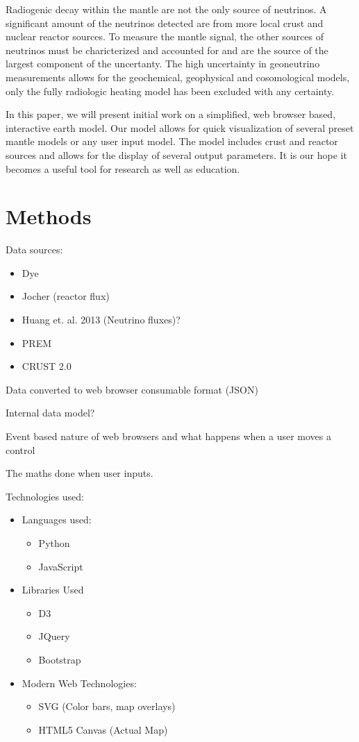 \documentclass[12pt,a4paper]{article}
\begin{document}
Radiogenic decay within the mantle are not the only source of neutrinos.
A significant amount of the neutrinos detected are from more local crust and nuclear reactor sources.
To measure the mantle signal, the other sources of neutrinos must be charicterized and accounted for and are the source of the largest component of the uncertanty\cite{Dye2010}.
The high uncertainty in geoneutrino measurements allows for the geochemical, geophysical and cosomological models, only the fully radiologic heating model has been excluded with any certainty\cite{McDonough2012}.

In this paper, we will present initial work on a simplified, web browser based, interactive earth model.
Our model allows for quick visualization of several preset mantle models or any user input model.
The model includes crust and reactor sources and allows for the display of several output parameters.
It is our hope it becomes a useful tool for research as well as education.

\section{Methods}
Data sources:
  \begin{itemize}
    \item Dye \cite{Dye2012}
    \item Jocher (reactor flux)
    \item Huang et. al. 2013 (Neutrino fluxes)?
    \item PREM
    \item CRUST 2.0
  \end{itemize}

  Data converted to web browser consumable format (JSON)

  Internal data model?

  Event based nature of web browsers and what happens when a user moves a control

  The maths done when user inputs.

Technologies used:
\begin{itemize}
  \item Languages used:
  \begin{itemize}
    \item Python
    \item JavaScript
  \end{itemize}
  \item  Libraries Used
  \begin{itemize}
    \item D3
    \item JQuery
    \item Bootstrap
  \end{itemize}
  \item Modern Web Technologies:
  \begin{itemize}
    \item SVG (Color bars, map overlays)
    \item HTML5 Canvas (Actual Map)
  \end{itemize}
\end{itemize}
\end{document}
